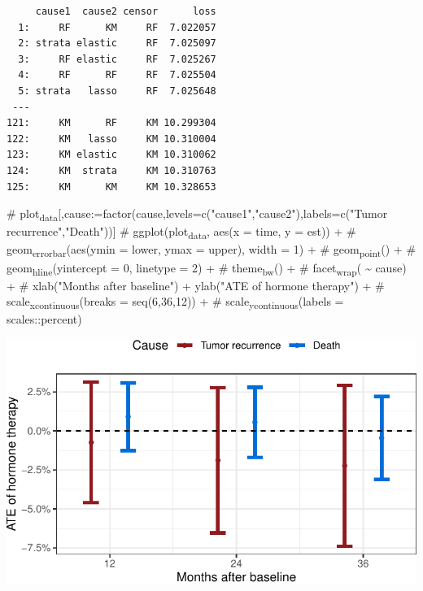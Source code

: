 \documentclass[11pt]{article}
\begin{document}
\begin{verbatim}
     cause1  cause2 censor      loss
  1:     RF      KM     RF  7.022057
  2: strata elastic     RF  7.025097
  3:     RF elastic     RF  7.025267
  4:     RF      RF     RF  7.025504
  5: strata   lasso     RF  7.025648
 ---                                
121:     KM      RF     KM 10.299304
122:     KM   lasso     KM 10.310004
123:     KM elastic     KM 10.310062
124:     KM  strata     KM 10.310763
125:     KM      KM     KM 10.328653
\end{verbatim}


\#	plot\textsubscript{data}[,cause:=factor(cause,levels=c("cause1","cause2"),labels=c("Tumor recurrence","Death"))]
\#	ggplot(plot\textsubscript{data}, aes(x = time, y = est)) +
\#	  geom\textsubscript{errorbar}(aes(ymin = lower, ymax = upper), width = 1) + 
\#	  geom\textsubscript{point}() +
\#	  geom\textsubscript{hline}(yintercept = 0, linetype = 2) +
\#	  theme\textsubscript{bw}() +
\#	  facet\textsubscript{wrap}( \textasciitilde{} cause) +
\#	  xlab("Months after baseline") + ylab("ATE of hormone therapy") +
\#	  scale\textsubscript{x}\textsubscript{continuous}(breaks = seq(6,36,12)) +
\#	  scale\textsubscript{y}\textsubscript{continuous}(labels = scales::percent)


\begin{center}
\includegraphics[width=.9\linewidth]{zelefsky-data-target-par.pdf}
\end{center}
\end{document}
